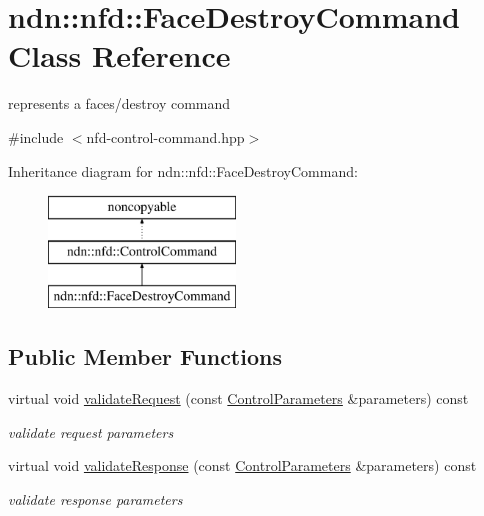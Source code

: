 \hypertarget{classndn_1_1nfd_1_1FaceDestroyCommand}{}\section{ndn\+:\+:nfd\+:\+:Face\+Destroy\+Command Class Reference}
\label{classndn_1_1nfd_1_1FaceDestroyCommand}


represents a faces/destroy command  




{\ttfamily \#include $<$nfd-\/control-\/command.\+hpp$>$}

Inheritance diagram for ndn\+:\+:nfd\+:\+:Face\+Destroy\+Command\+:\begin{figure}[H]
\begin{center}
\leavevmode
\includegraphics[height=3.000000cm]{classndn_1_1nfd_1_1FaceDestroyCommand}
\end{center}
\end{figure}
\subsection*{Public Member Functions}
\begin{DoxyCompactItemize}
\item 
virtual void \hyperlink{classndn_1_1nfd_1_1FaceDestroyCommand_aeac676bf2e0a282bb66401fd0e28bf7d}{validate\+Request} (const \hyperlink{classndn_1_1nfd_1_1ControlParameters}{Control\+Parameters} \&parameters) const
\begin{DoxyCompactList}\small\item\em validate request parameters \end{DoxyCompactList}\item 
virtual void \hyperlink{classndn_1_1nfd_1_1FaceDestroyCommand_a4c1b0b12dce8d11f355231a0ba983e85}{validate\+Response} (const \hyperlink{classndn_1_1nfd_1_1ControlParameters}{Control\+Parameters} \&parameters) const
\begin{DoxyCompactList}\small\item\em validate response parameters \end{DoxyCompactList}\end{DoxyCompactItemize}
